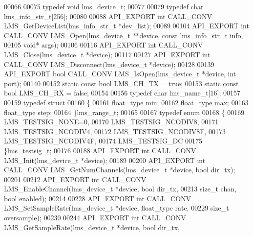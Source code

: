 \begin{DoxyCode}
00066 
00075 \textcolor{keyword}{typedef} \textcolor{keywordtype}{void} lms_device_t;
00077 
00079 \textcolor{keyword}{typedef} \textcolor{keywordtype}{char} lms_info_str_t[256];
00080 
00088 API_EXPORT \textcolor{keywordtype}{int} CALL_CONV LMS_GetDeviceList(lms\_info\_str\_t *dev\_list);
00089 
00104 API_EXPORT \textcolor{keywordtype}{int} CALL_CONV LMS_Open(lms\_device\_t **device, \textcolor{keyword}{const} lms\_info\_str\_t 
      info,
00105                                                          \textcolor{keywordtype}{void}* args);
00106 
00116 API_EXPORT \textcolor{keywordtype}{int} CALL_CONV LMS_Close(lms\_device\_t *device);
00117 
00127 API_EXPORT \textcolor{keywordtype}{int} CALL_CONV LMS_Disconnect(lms\_device\_t *device);
00128 
00139 API_EXPORT \textcolor{keywordtype}{bool} CALL_CONV LMS_IsOpen(lms\_device\_t *device, \textcolor{keywordtype}{int} port);
00140 
00152 \textcolor{keyword}{static} \textcolor{keyword}{const} \textcolor{keywordtype}{bool} LMS_CH_TX = \textcolor{keyword}{true};   
00153 \textcolor{keyword}{static} \textcolor{keyword}{const} \textcolor{keywordtype}{bool} LMS_CH_RX = \textcolor{keyword}{false};  
00154 
00156 \textcolor{keyword}{typedef} \textcolor{keywordtype}{char} lms_name_t[16];
00157 
00159 \textcolor{keyword}{typedef} \textcolor{keyword}{struct}
00160 \{
00161     float\_type min;     
00162     float\_type max;     
00163     float\_type step;    
00164 \}lms_range_t;
00165 
00167 \textcolor{keyword}{typedef} \textcolor{keyword}{enum}
00168 \{
00169     LMS_TESTSIG_NONE=0,     
00170     LMS_TESTSIG_NCODIV8,    
00171     LMS_TESTSIG_NCODIV4,    
00172     LMS_TESTSIG_NCODIV8F,   
00173     LMS_TESTSIG_NCODIV4F,   
00174     LMS_TESTSIG_DC          
00175 \}lms_testsig_t;
00176 
00188 API_EXPORT \textcolor{keywordtype}{int} CALL_CONV LMS_Init(lms\_device\_t *device);
00189 
00200 API_EXPORT \textcolor{keywordtype}{int} CALL_CONV LMS_GetNumChannels(lms\_device\_t *device, \textcolor{keywordtype}{bool} dir_tx);
00201 
00212 API_EXPORT \textcolor{keywordtype}{int} CALL_CONV LMS_EnableChannel(lms\_device\_t *device, \textcolor{keywordtype}{bool} dir_tx,
00213                                            \textcolor{keywordtype}{size\_t} chan, \textcolor{keywordtype}{bool} enabled);
00214 
00228 API_EXPORT \textcolor{keywordtype}{int} CALL_CONV LMS_SetSampleRate(lms\_device\_t *device, float\_type rate,
00229                                            \textcolor{keywordtype}{size\_t} oversample);
00230 
00244 API_EXPORT \textcolor{keywordtype}{int} CALL_CONV LMS_GetSampleRate(lms\_device\_t *device, \textcolor{keywordtype}{bool} dir_tx,

\end{DoxyCode}
